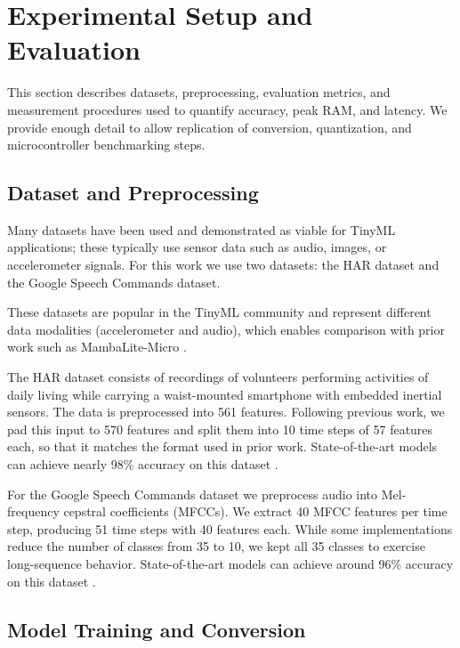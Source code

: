 \section{Experimental Setup and Evaluation}
\label{sec:experimental_setup}

This section describes datasets, preprocessing, evaluation metrics, and measurement procedures used to quantify accuracy, peak RAM, and latency. We provide enough detail to allow replication of conversion, quantization, and microcontroller benchmarking steps.

\subsection{Dataset and Preprocessing}

Many datasets have been used and demonstrated as viable for TinyML applications; these typically use sensor data such as audio, images, or accelerometer signals. For this work we use two datasets: the HAR dataset and the Google Speech Commands dataset.

These datasets are popular in the TinyML community and represent different data modalities (accelerometer and audio), which enables comparison with prior work such as MambaLite-Micro \cite{xuMambaLiteMicroMemoryOptimizedMamba2025}.

The HAR dataset consists of recordings of volunteers performing activities of daily living while carrying a waist-mounted smartphone with embedded inertial sensors. The data is preprocessed into 561 features. Following previous work, we pad this input to 570 features and split them into 10 time steps of 57 features each, so that it matches the format used in prior work. State-of-the-art models can achieve nearly 98\% accuracy on this dataset \cite{enokiboriRTsfNetDNNModel2024}.

For the Google Speech Commands dataset we preprocess audio into Mel-frequency cepstral coefficients (MFCCs). We extract 40 MFCC features per time step, producing 51 time steps with 40 features each. While some implementations reduce the number of classes from 35 to 10, we kept all 35 classes to exercise long-sequence behavior. State-of-the-art models can achieve around 96\% accuracy on this dataset \cite{wangEfficientSpeechCommand}.

\subsection{Model Training and Conversion}

